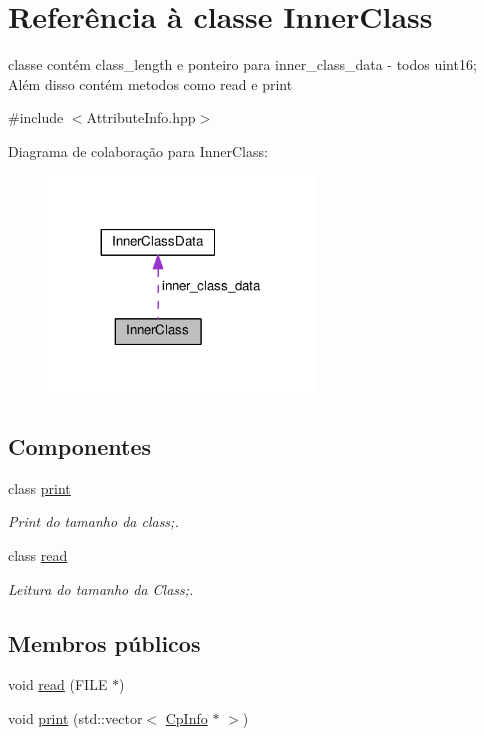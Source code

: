 \hypertarget{class_inner_class}{}\section{Referência à classe Inner\+Class}
\label{class_inner_class}


classe contém class\+\_\+length e ponteiro para inner\+\_\+class\+\_\+data -\/ todos uint16; Além disso contém metodos como read e print  




{\ttfamily \#include $<$Attribute\+Info.\+hpp$>$}



Diagrama de colaboração para Inner\+Class\+:
\nopagebreak
\begin{figure}[H]
\begin{center}
\leavevmode
\includegraphics[width=200pt]{class_inner_class__coll__graph}
\end{center}
\end{figure}
\subsection*{Componentes}
\begin{DoxyCompactItemize}
\item 
class \hyperlink{class_inner_class_1_1print}{print}
\begin{DoxyCompactList}\small\item\em Print do tamanho da class;. \end{DoxyCompactList}\item 
class \hyperlink{class_inner_class_1_1read}{read}
\begin{DoxyCompactList}\small\item\em Leitura do tamanho da Class;. \end{DoxyCompactList}\end{DoxyCompactItemize}
\subsection*{Membros públicos}
\begin{DoxyCompactItemize}
\item 
void \hyperlink{class_inner_class_ab178cb43a3277c1ade99a8a0c346cd49}{read} (F\+I\+LE $\ast$)
\item 
void \hyperlink{class_inner_class_acf89443e049952e22a4afeaa43e3bc8c}{print} (std\+::vector$<$ \hyperlink{class_cp_info}{Cp\+Info} $\ast$ $>$)
\end{DoxyCompactItemize}

